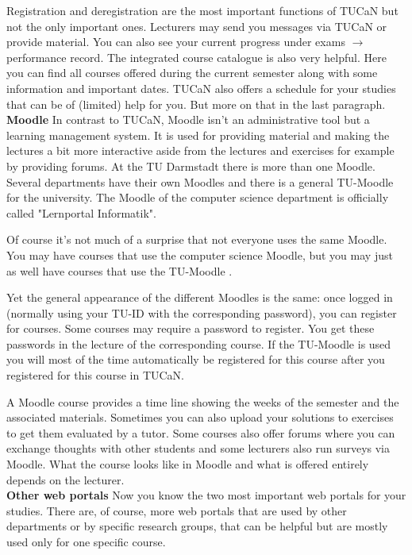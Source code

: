 {\begin{multicols}{2}
    Registration and deregistration are the most important functions of TUCaN but not the only important ones. Lecturers may send you messages via TUCaN or provide material. You can also see your current progress under exams $\rightarrow$ performance record. The integrated course catalogue is also very helpful. Here you can find all courses offered during the current semester along with some information and important dates. TUCaN also offers a schedule for your studies that can be of (limited) help for you. But more on that in the last paragraph.\\

    \noindent\textbf{Moodle}
    In contrast to TUCaN, Moodle isn't an administrative tool but a learning management system. It is used for providing material and making the lectures a bit more interactive aside from the lectures and exercises for example by providing forums. At the TU Darmstadt there is more than one Moodle. Several departments have their own Moodles and there is a general TU-Moodle for the university. The Moodle of the computer science department \footnotemark[2] is officially called "Lernportal Informatik".

    Of course it's not much of a surprise that not everyone uses the same Moodle. You may have courses that use the computer science Moodle, but you may just as well have courses that use the TU-Moodle \footnotemark[3].

    Yet the general appearance of the different Moodles is the same: once logged in (normally using your TU-ID with the corresponding password), you can register for courses. Some courses may require a password to register. You get these passwords in the lecture of the corresponding course. If the TU-Moodle is used you will most of the time automatically be registered for this course after you registered for this course in TUCaN.

    A Moodle course provides a time line showing the weeks of the semester and the associated materials. Sometimes you can also upload your solutions to exercises to get them evaluated by a tutor. Some courses also offer forums where you can exchange thoughts with other students and some lecturers also run surveys via Moodle. What the course looks like in Moodle and what is offered entirely depends on the lecturer.\\

    \noindent\textbf{Other web portals}
    Now you know the two most important web portals for your studies. There are, of course, more web portals that are used by other departments or by specific research groups, that can be helpful but are mostly used only for one specific course.


\end{multicols}}
